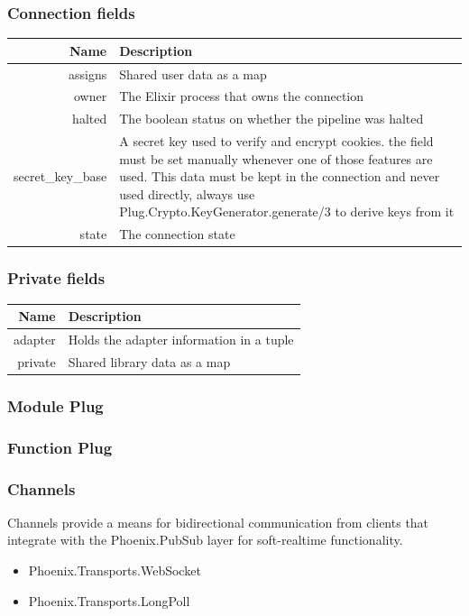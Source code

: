 \documentclass{beamer}
\begin{document}
\begin{frame}
\frametitle{Connection fields}
\begin{flushleft}
  \tiny
  \begin{tabular}{|r|p{3.5in}|}
    \hline
    \textbf{Name}  & \textbf{Description} \\ \hline
       assigns & Shared user data as a map \\
       owner & The Elixir process that owns the connection \\
       halted & The boolean status on whether the pipeline was halted \\
secret\_key\_base & A secret key used to verify and encrypt cookies. the field must be set manually whenever one of those features are used. This data must be kept in the connection and never used directly, always use Plug.Crypto.KeyGenerator.generate/3 to derive keys from it \\
state & The connection state \\ \hline

\end{tabular}
\end{flushleft}
\end{frame}

\begin{frame}
\frametitle{Private fields}

\begin{flushleft}
  \tiny
  \begin{tabular}{|r|p{3.5in}|}
  \hline
  \textbf{Name} & \textbf{Description} \\ \hline
    
    adapter & Holds the adapter information in a tuple \\
    private & Shared library data as a map \\ \hline

  \end{tabular}
\end{flushleft}



\end{frame}

\begin{frame}
\frametitle{Module Plug}
\ModulePlug
\end{frame}

\begin{frame}
\frametitle{Function Plug}
\FunctionPlug
\end{frame}


\begin{frame}
\frametitle{Channels}
Channels provide a means for bidirectional communication from clients that integrate with the Phoenix.PubSub layer for \alert{soft-realtime} functionality.

\begin{itemize}
\item{Phoenix.Transports.WebSocket}
\item{Phoenix.Transports.LongPoll}
\end{itemize}
\end{frame}
\end{document}
